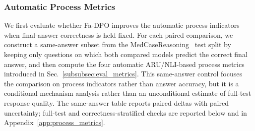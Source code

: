 \documentclass[a4paper,fleqn,doubleblind]{cas-sc}
\begin{document}
\subsubsection{Automatic Process Metrics}
We first evaluate whether Fa-DPO improves the automatic process indicators when final-answer correctness is held fixed. For each paired comparison, we construct a same-answer subset from the MedCaseReasoning~\cite{wu2025medcasereasoning} test split by keeping only questions on which both compared models predict the correct final answer, and then compute the four automatic ARU/NLI-based process metrics introduced in Sec.~\ref{subsubsec:eval_metrics}. This same-answer control focuses the comparison on process indicators rather than answer accuracy, but it is a conditional mechanism analysis rather than an unconditional estimate of full-test response quality. The same-answer table reports paired deltas with paired uncertainty; full-test and correctness-stratified checks are reported below and in Appendix~\ref{app:process_metrics}.
\end{document}
